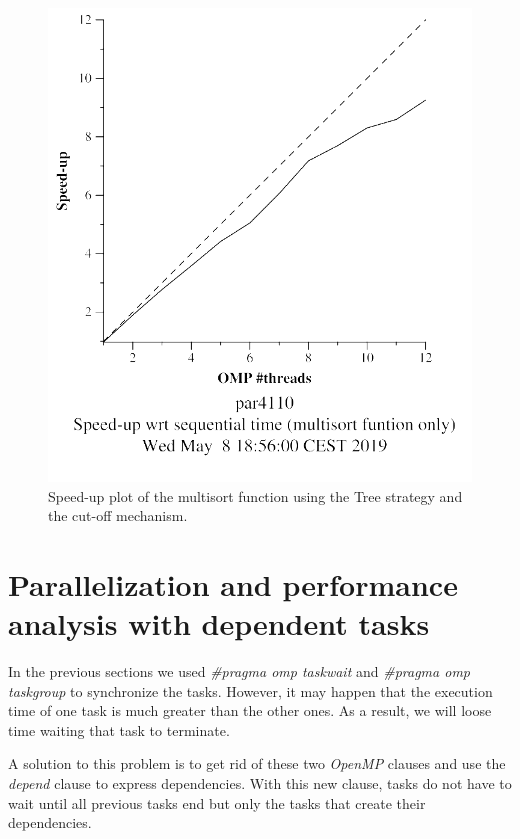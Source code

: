 \documentclass[12pt, a4paper]{article}
\begin{document}
\begin{figure}[H]
\begin{minipage}[b]{0.4\linewidth}
  \includegraphics[scale=0.5]{./S2/S2_strong_scalability/multisort-omp-strong_boada-4_tree_cutoff_multisort_only}
  \caption{Speed-up plot of the multisort function using the Tree strategy and the cut-off mechanism.}
  \label{fig:mandel-omp-10000-strong-21-speedup}
\end{minipage}
\end{figure}

\section{Parallelization and performance analysis with dependent tasks}

In the previous sections we used \textit{\#pragma omp taskwait} and \textit{\#pragma omp taskgroup} to synchronize the tasks. However, it may happen that the execution time of one task is much greater than the other ones. As a result, we will loose time waiting that task to terminate.

A solution to this problem is to get rid of these two \textit{OpenMP} clauses and use the \textit{depend} clause to express dependencies. With this new clause, tasks do not have to wait until all previous tasks end but only the tasks that create their dependencies.
\end{document}
